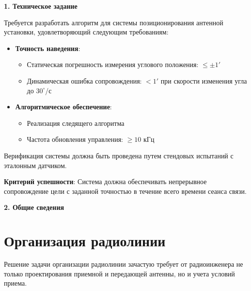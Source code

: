 \newpage
\begin{center}
  \textbf{\large 1. Техническое задание}
\end{center}

Требуется разработать алгоритм для системы позиционирования антенной установки, удовлетворяющий следующим требованиям:

\begin{itemize}[leftmargin=*]
    \item \textbf{Точность наведения}:
    \begin{itemize}[label=--]
        \item Статическая погрешность измерения углового положения: $\leq \pm 1'$ 
        \item Динамическая ошибка сопровождения: $< 1'$ при скорости изменения угла до $30^\circ$/с
    \end{itemize}

    \item \textbf{Алгоритмическое обеспечение}:
    \begin{itemize}[label=--]
        \item Реализация следящего алгоритма
        \item Частота обновления управления: $\geq 10$ кГц
    \end{itemize}
  \end{itemize}
  

  Верификация системы должна быть проведена путем стендовых испытаний с эталонным датчиком.

\noindent\textbf{Критерий успешности}: Система должна обеспечивать непрерывное сопровождение цели с заданной точностью 
в течение всего времени сеанса связи.

\newpage
\begin{center}
  \textbf{\large 2. Общие сведения}
\end{center}

\section{Организация радиолинии}

Решение задачи организации радиолинии зачастую требует от радиоинженера не только проектирования приемной и передающей антенны, но и учета условий приема. 

